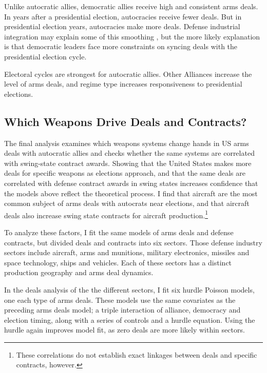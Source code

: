 \documentclass[12pt]{article}
\begin{document}
Unlike autocratic allies, democratic allies receive high and consistent arms deals.
In years after a presidential election, autocracies receive fewer deals. 
But in presidential election years, autocracies make more deals.
Defense industrial integration may explain some of this smoothing \citep{Brooks2005}, but the more likely explanation is that democratic leaders face more constraints on syncing deals with the presidential election cycle.



Electoral cycles are strongest for autocratic allies. 
Other 
Alliances increase the level of arms deals, and regime type increases responsiveness to presidential elections. 

\subsection{Which Weapons Drive Deals and Contracts?} 


The final analysis examines which weapons systems change hands in US arms deals with autocratic allies and checks whether the same systems are correlated with swing-state contract awards. 
Showing that the United States makes more deals for specific weapons as elections approach, and that the same deals are correlated with defense contract awards in swing states increases confidence that the models above reflect the theoretical process. 
I find that aircraft are the most common subject of arms deals with autocrats near elections, and that aircraft deals also increase swing state contracts for aircraft production.\footnote{These correlations do not establish exact linkages between deals and specific contracts, however.}


To analyze these factors, I fit the same models of arms deals and defense contracts, but divided deals and contracts into six sectors. 
Those defense industry sectors include aircraft, arms and munitions, military electronics, missiles and space technology, ships and vehicles.  
Each of these sectors has a distinct production geography and arms deal dynamics.


In the deals analysis of the the different sectors, I fit six hurdle Poisson models, one each type of arms deals. 
These models use the same covariates as the preceding arms deals model; a triple interaction of alliance, democracy and election timing, along with a series of controls and a hurdle equation.
Using the hurdle again improves model fit, as zero deals are more likely within sectors. 
\end{document}
